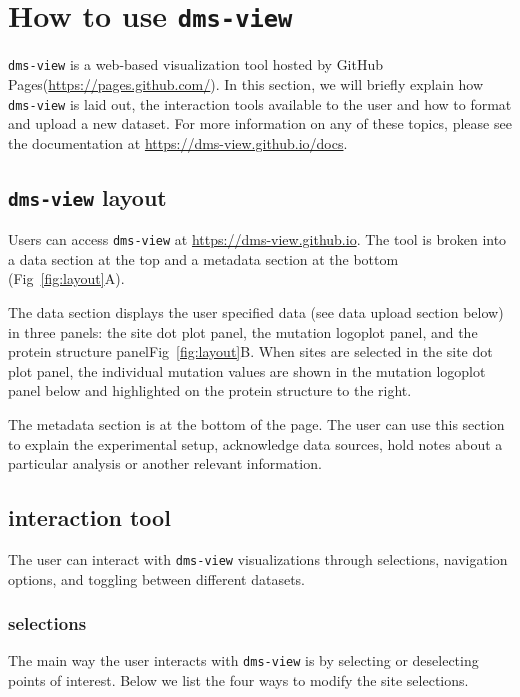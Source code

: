 \section{How to use \texttt{dms-view}}

\texttt{dms-view} is a web-based visualization tool hosted by GitHub Pages(\url{https://pages.github.com/}).
In this section, we will briefly explain how \texttt{dms-view} is laid out, the interaction tools available to the user and how to format and upload a new dataset.
For more information on any of these topics, please see the documentation at \url{https://dms-view.github.io/docs}.

\subsection{\texttt{dms-view} layout}

Users can access \texttt{dms-view} at \url{https://dms-view.github.io}.
The tool is broken into a data section at the top and a metadata section at the bottom (Fig~\ref{fig:layout}A).

The data section displays the user specified data (see data upload section below) in three panels: the site dot plot panel, the mutation logoplot panel, and the protein structure panelFig~\ref{fig:layout}B.
When sites are selected in the site dot plot panel, the individual mutation values are shown in the mutation logoplot panel below and highlighted on the protein structure to the right.

The metadata section is at the bottom of the page.
The user can use this section to explain the experimental setup, acknowledge data sources, hold notes about a particular analysis or another relevant information.

\subsection{interaction tool}

The user can interact with \texttt{dms-view} visualizations through selections, navigation options, and toggling between different datasets.

\subsubsection{selections}

The main way the user interacts with \texttt{dms-view} is by selecting or deselecting points of interest.
Below we list the four ways to modify the site selections.

